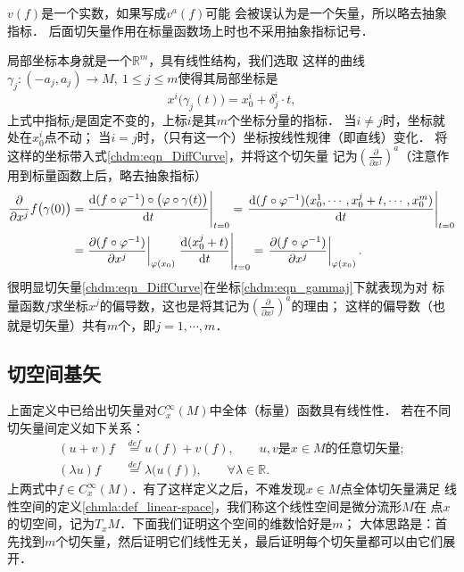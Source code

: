 \begin{remark}\label{chdm_rek-vnoa}
    $v(f)$是一个实数，如果写成$v^a(f)$可能
    会被误认为是一个矢量，所以略去抽象指标．
    后面切矢量作用在标量函数场上时也不采用抽象指标记号．
\end{remark}
局部坐标本身就是一个$\mathbb{R}^m$，具有线性结构，我们选取
这样的曲线$\gamma_j:(-a_j,a_j)\to M,\ 1\leqslant j \leqslant m$使得其局部坐标是
\begin{equation}\label{chdm:eqn_gammaj}
    x^i\bigl({\gamma_j}(t)\bigr)= x^i_0 + \delta^i _j \cdot t,
\end{equation}
上式中指标$j$是固定不变的，上标$i$是其$m$个坐标分量的指标．
当$i\neq j$时，坐标就处在$x^i_0$点不动；
当$i=j$时，（只有这一个）坐标按线性规律（即直线）变化．
将这样的坐标带入式\eqref{chdm:eqn_DiffCurve}，并将这个切矢量
记为$(\frac{\partial }{\partial x^j})^a$（注意作用到标量函数上后，略去抽象指标）
\begin{align*}
    \frac{\partial }{\partial x^j} f\bigl(\gamma (0)\bigr) =& \left. 
    \frac{{\rm d} (f \circ\varphi^{-1}) \circ\bigl(\varphi\circ \gamma (t)\bigr)}{{\rm d} t}  \right |_{t=0}
    =  \left. \frac{{\rm d} (f \circ\varphi^{-1}) (x^1_0,\cdots, x^j_0 + t, \cdots ,x^m_0)}{{\rm d} t}  \right |_{t=0}  \\
    =& \left.\frac{\partial (f \circ\varphi^{-1})}{\partial x^j}\right|_{\varphi(x_0)} 
    \left.\frac{{\rm d}(x^j_0 + t) }{{\rm d} t} \right|_{t=0}
    = \left.\frac{\partial (f \circ\varphi^{-1})}{\partial x^j}\right|_{\varphi(x_0)} .
\end{align*}
很明显切矢量\eqref{chdm:eqn_DiffCurve}在坐标\eqref{chdm:eqn_gammaj}下就表现为对
标量函数$f$求坐标$x^j$的偏导数，这也是将其记为$(\frac{\partial }{\partial x^j})^a$的理由；
这样的偏导数（也就是切矢量）共有$m$个，即$j=1,\cdots,m$．

\subsection{切空间基矢}
上面定义中已给出切矢量对$C^\infty_x(M)$中全体（标量）函数具有线性性．
若在不同切矢量间定义如下关系：
\begin{subequations}
    \begin{align}
        (u+v)f & \overset{def}{=} u(f) + v(f),\qquad {\text {$u,v$是$x\in M$的任意切矢量}}; \\
        (\lambda u) f & \overset{def}{=} \lambda \bigl( u(f)\bigr), \qquad \forall\lambda\in \mathbb{R}.
    \end{align}
\end{subequations}
上两式中$f\in C^\infty_x(M)$．有了这样定义之后，不难发现$x\in M$点{\kaishu 全体切矢量}满足
线性空间的定义\ref{chmla:def_linear-space}，我们称这个线性空间是微分流形$M$在
点$x$的{\heiti 切空间}，记为$T_x M$．下面我们证明这个空间的维数恰好是$m$；
大体思路是：首先找到$m$个切矢量，然后证明它们线性无关，最后证明每个切矢量都可以由它们展开．


